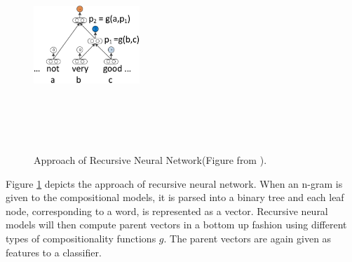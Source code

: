 \documentclass[11pt,a4paper]{article}
\begin{document}
\begin{figure}[ht!]
\centering
\includegraphics[width=40mm, height=80mm]{img/recursiveNN.eps}
\caption{Approach of Recursive Neural Network(Figure from \cite{Socher:13}). \label{fig:recursiveNN}}
\end{figure}
Figure \ref{fig:recursiveNN} depicts the approach of recursive neural network. When an n-gram is given to the compositional models, it is parsed into a binary tree and each leaf node, corresponding to a word, is represented as a vector. Recursive neural models will then  compute parent vectors in a bottom up fashion using different types of compositionality functions $g$. The parent vectors are again given as features to a classifier.
\end{document}
